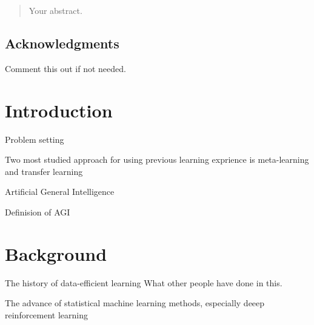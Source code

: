 \documentclass[12pt,twoside]{report}
\date{September 2015}
\begin{document}



\clearpage{\pagestyle{empty}\cleardoublepage}
\setcounter{page}{1}
\pagestyle{fancy}

\begin{abstract}
Your abstract.
\end{abstract}

\cleardoublepage
\section*{Acknowledgments}
Comment this out if not needed.

\clearpage{\pagestyle{empty}\cleardoublepage}

\tableofcontents


\clearpage{\pagestyle{empty}\cleardoublepage}
\setcounter{page}{1}
\fancyhead[LE,RO]{\slshape \rightmark}
\fancyhead[LO,RE]{\slshape \leftmark}

\chapter{Introduction}

Problem setting

Two most studied approach for using previous learning exprience is meta-learning and transfer learning

 Artificial General Intelligence

Definision of AGI

\chapter{Background}

The history of data-efficient learning
What other people have done in this.

The advance of statistical machine learning methods, especially deeep reinforcement learning
\end{document}
